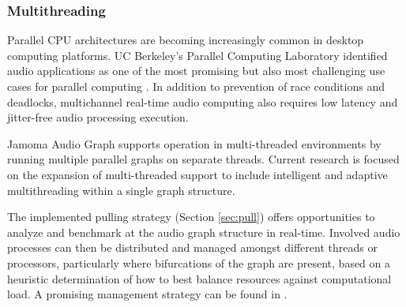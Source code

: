 \documentclass[twoside,a4paper]{article}
\begin{document}

\subsubsection{Multithreading} %

Parallel CPU architectures are becoming increasingly common in desktop computing platforms.
UC Berkeley's Parallel Computing Laboratory identified audio applications as one of the most promising but also most challenging use cases for parallel computing \cite{asanovic2008parallel}. 
In addition to prevention of race conditions and deadlocks, multichannel real-time audio computing also requires low latency and jitter-free audio processing execution.

Jamoma Audio Graph supports operation in multi-threaded environments by running multiple parallel graphs on separate threads.  Current research is focused on the expansion of multi-threaded support to include intelligent and adaptive multithreading within a single graph structure.  

The implemented pulling strategy (Section \ref{sec:pull}) offers opportunities to analyze and benchmark at the audio graph structure in real-time.  Involved audio processes can then be distributed and managed amongst different threads or processors, particularly where bifurcations of the graph are present, based on a heuristic determination of how to best balance resources against computational load.  A promising management strategy can be found in \cite{PartzschAES122}.




\end{document}
